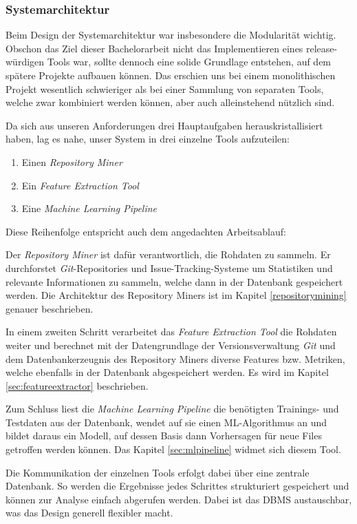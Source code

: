 \documentclass[10pt, a4paper]{article}
\begin{document}
\subsubsection{Systemarchitektur}
Beim Design der Systemarchitektur war insbesondere die Modularität wichtig. Obschon das Ziel dieser Bachelorarbeit nicht das Implementieren eines release-würdigen Tools war, sollte dennoch eine solide Grundlage entstehen, auf dem spätere Projekte aufbauen können. Das erschien uns bei einem monolithischen Projekt wesentlich schwieriger als bei einer Sammlung von separaten Tools, welche zwar kombiniert werden können, aber auch alleinstehend nützlich sind.

Da sich aus unseren Anforderungen drei Hauptaufgaben herauskristallisiert haben, lag es nahe, unser System in drei einzelne Tools aufzuteilen:
\begin{enumerate}
	\item Einen \emph{Repository Miner}
	\item Ein \emph{Feature Extraction Tool}
	\item Eine \emph{Machine Learning Pipeline}
\end{enumerate}

Diese Reihenfolge entspricht auch dem angedachten Arbeitsablauf:

Der \emph{Repository Miner} ist dafür verantwortlich, die Rohdaten zu sammeln. Er durchforstet \emph{Git}-Repositories und Issue-Tracking-Systeme um Statistiken und relevante Informationen zu sammeln, welche dann in der Datenbank gespeichert werden.
Die Architektur des Repository Miners ist im Kapitel \ref{repositorymining} genauer beschrieben.

In einem zweiten Schritt verarbeitet das \emph{Feature Extraction Tool} die Rohdaten weiter und berechnet mit der Datengrundlage der Versionsverwaltung \emph{Git} und dem Datenbankerzeugnis des Repository Miners diverse Features bzw. Metriken, welche ebenfalls in der Datenbank abgespeichert werden. Es wird im Kapitel \ref{sec:featureextractor} beschrieben.

Zum Schluss liest die \emph{Machine Learning Pipeline} die benötigten Trainings- und Testdaten aus der Datenbank, wendet auf sie einen \ac{ML}-Algorithmus an und bildet daraus ein Modell, auf dessen Basis dann Vorhersagen für neue Files getroffen werden können. Das Kapitel \ref{sec:mlpipeline} widmet sich diesem Tool.

Die Kommunikation der einzelnen Tools erfolgt dabei über eine zentrale Datenbank. So werden die Ergebnisse jedes Schrittes strukturiert gespeichert und können zur Analyse einfach abgerufen werden. Dabei ist das \ac{DBMS} austauschbar, was das Design generell flexibler macht.
\end{document}
